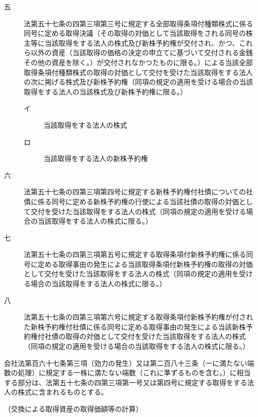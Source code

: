 \documentclass[twocolumn,a4j,10pt]{ltjtarticle}
\begin{document}
\begin{description}
\begin{description}
\item[五]法第五十七条の四第三項第三号に規定する全部取得条項付種類株式に係る同号に定める取得決議（その取得の対価として当該取得をされる同号の株主等に当該取得をする法人の株式及び新株予約権が交付され、かつ、これら以外の資産（当該取得の価格の決定の申立てに基づいて交付される金銭その他の資産を除く。）が交付されなかつたものに限る。）による当該全部取得条項付種類株式の取得の対価として交付を受けた当該取得をする法人の次に掲げる株式及び新株予約権（同項の規定の適用を受ける場合の当該取得をする法人の当該株式及び新株予約権に限る。）
\begin{description}
\item[イ]当該取得をする法人の株式
\item[ロ]当該取得をする法人の新株予約権
\end{description}
\item[六]法第五十七条の四第三項第四号に規定する新株予約権付社債についての社債に係る同号に定める新株予約権の行使による当該社債の取得の対価として交付を受けた当該取得をする法人の株式（同項の規定の適用を受ける場合の当該取得をする法人の株式に限る。）
\item[七]法第五十七条の四第三項第五号に規定する取得条項付新株予約権に係る同号に定める取得事由の発生による当該取得条項付新株予約権の取得の対価として交付を受けた当該取得をする法人の株式（同項の規定の適用を受ける場合の当該取得をする法人の株式に限る。）
\item[八]法第五十七条の四第三項第六号に規定する取得条項付新株予約権が付された新株予約権付社債に係る同号に定める取得事由の発生による当該新株予約権付社債の取得の対価として交付を受けた当該取得をする法人の株式（同項の規定の適用を受ける場合の当該取得をする法人の株式に限る。）
\end{description}
\item[\rensuji{8}]会社法第百六十七条第三項（効力の発生）又は第二百八十三条（一に満たない端数の処理）に規定する一株に満たない端数（これに準ずるものを含む。）に相当する部分は、法第五十七条の四第三項第一号又は第四号に規定する取得をする法人の株式に含まれるものとする。
\end{description}
\noindent\hspace{10pt}（交換による取得資産の取得価額等の計算）
\end{document}
